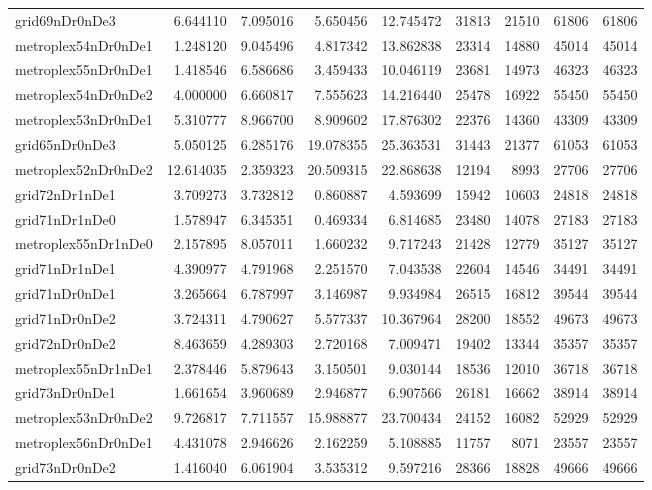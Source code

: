 \begin{longtable}{|l|r|r|r|r|r|r|r|r|}
grid69nDr0nDe3 & 6.644110 & 7.095016 & 5.650456 & 12.745472 & 31813 & 21510 & 61806 & 61806 \\
metroplex54nDr0nDe1 & 1.248120 & 9.045496 & 4.817342 & 13.862838 & 23314 & 14880 & 45014 & 45014 \\
metroplex55nDr0nDe1 & 1.418546 & 6.586686 & 3.459433 & 10.046119 & 23681 & 14973 & 46323 & 46323 \\
metroplex54nDr0nDe2 & 4.000000 & 6.660817 & 7.555623 & 14.216440 & 25478 & 16922 & 55450 & 55450 \\
metroplex53nDr0nDe1 & 5.310777 & 8.966700 & 8.909602 & 17.876302 & 22376 & 14360 & 43309 & 43309 \\
grid65nDr0nDe3 & 5.050125 & 6.285176 & 19.078355 & 25.363531 & 31443 & 21377 & 61053 & 61053 \\
metroplex52nDr0nDe2 & 12.614035 & 2.359323 & 20.509315 & 22.868638 & 12194 & 8993 & 27706 & 27706 \\
grid72nDr1nDe1 & 3.709273 & 3.732812 & 0.860887 & 4.593699 & 15942 & 10603 & 24818 & 24818 \\
grid71nDr1nDe0 & 1.578947 & 6.345351 & 0.469334 & 6.814685 & 23480 & 14078 & 27183 & 27183 \\
metroplex55nDr1nDe0 & 2.157895 & 8.057011 & 1.660232 & 9.717243 & 21428 & 12779 & 35127 & 35127 \\
grid71nDr1nDe1 & 4.390977 & 4.791968 & 2.251570 & 7.043538 & 22604 & 14546 & 34491 & 34491 \\
grid71nDr0nDe1 & 3.265664 & 6.787997 & 3.146987 & 9.934984 & 26515 & 16812 & 39544 & 39544 \\
grid71nDr0nDe2 & 3.724311 & 4.790627 & 5.577337 & 10.367964 & 28200 & 18552 & 49673 & 49673 \\
grid72nDr0nDe2 & 8.463659 & 4.289303 & 2.720168 & 7.009471 & 19402 & 13344 & 35357 & 35357 \\
metroplex55nDr1nDe1 & 2.378446 & 5.879643 & 3.150501 & 9.030144 & 18536 & 12010 & 36718 & 36718 \\
grid73nDr0nDe1 & 1.661654 & 3.960689 & 2.946877 & 6.907566 & 26181 & 16662 & 38914 & 38914 \\
metroplex53nDr0nDe2 & 9.726817 & 7.711557 & 15.988877 & 23.700434 & 24152 & 16082 & 52929 & 52929 \\
metroplex56nDr0nDe1 & 4.431078 & 2.946626 & 2.162259 & 5.108885 & 11757 & 8071 & 23557 & 23557 \\
grid73nDr0nDe2 & 1.416040 & 6.061904 & 3.535312 & 9.597216 & 28366 & 18828 & 49666 & 49666 \\

\end{longtable}

